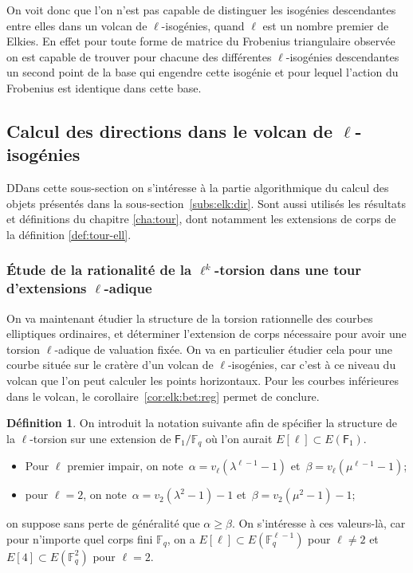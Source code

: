 \documentclass[10pt,a4paper]{book}
\theoremstyle{plain}
\theoremstyle{definition}
\theoremstyle{definition}
\theoremstyle{definition}
\theoremstyle{definition}
\newtheorem{defi}[thm]{Définition}
\theoremstyle{remark}
\theoremstyle{remark}
\theoremstyle{definition}
\begin{document}
On voit donc que l'on n'est pas capable de distinguer les isogénies 
descendantes entre elles dans un volcan de $\ell$-isogénies, quand $\ell$ est un 
nombre premier de Elkies. En effet pour toute forme de matrice du Frobenius 
triangulaire observée on est capable de trouver pour chacune des différentes 
$\ell$-isogénies descendantes un second point de la base qui engendre cette
isogénie et pour lequel l'action du Frobenius est identique dans cette base.

\subsection{Calcul des directions dans le volcan de $\ell$-isogénies}
\label{sub:con:poi}

DDans cette sous-section on s'intéresse à la partie algorithmique du calcul des
objets présentés dans la sous-section~\ref{subs:elk:dir}. Sont aussi utilisés 
les résultats et définitions du chapitre \ref{cha:tour}, dont notamment les 
extensions de corps de la définition \ref{def:tour-ell}.

\subsubsection{\'Etude de la rationalité de la $\ell^k$-torsion dans une tour d'extensions $\ell$-adique}
\label{sub:classes}

On va maintenant étudier la structure de la torsion rationnelle des courbes 
elliptiques ordinaires, et déterminer l'extension de corps 
nécessaire pour avoir une torsion $\ell$-adique de valuation fixée.
On va en particulier étudier cela pour une courbe située sur le cratère
d'un volcan de $\ell$-isogénies, car c'est à ce niveau du volcan que l'on peut 
calculer les points horizontaux. Pour les courbes inférieures dans le volcan,
le corollaire~\ref{cor:elk:bet:reg} permet de conclure. 

\begin{defi}
\label{def:alp:bet}
On introduit la notation suivante afin de spécifier la structure de la 
$\ell$-torsion sur une extension de $\mathsf{F}_1 /\mathbb{F}_q$ où l'on aurait
$E[\ell] \subset E(\mathsf{F}_1)$.
\begin{itemize}
\item Pour $\ell$ premier impair, on note~$\alpha= v_{\ell}(\lambda^{\ell-1}-1)$ 
et~$\beta=v_{\ell}(\mu^{\ell-1}-1)$; 
\item pour $\ell=2$, on note~$\alpha=v_2(\lambda^2-1)-1$ et~$\beta = v_2(\mu^2-1)-1$;
\end{itemize}
on suppose sans perte de généralité que $\alpha \geqslant \beta$. On s'intéresse à ces 
valeurs-là, car pour n'importe quel corps fini $\mathbb{F}_q$, on a $E[\ell] 
\subset E(\mathbb{F}_q^{\ell-1})$ pour $\ell \neq 2$ et $E[4] \subset 
E(\mathbb{F}_q^{2})$ pour $\ell=2$. 
\end{defi}
 
\end{document}
